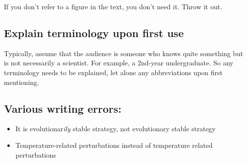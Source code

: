 \documentclass[
]{book}
\providecommand{\tightlist}{%
  \setlength{\itemsep}{0pt}\setlength{\parskip}{0pt}}
\begin{document}
If you don't refer to a figure in the text, you don't need it. Throw it out.

\hypertarget{explain-terminology-upon-first-use}{%
\subsection{Explain terminology upon first use}\label{explain-terminology-upon-first-use}}

Typically, assume that the audience is someone who knows quite something
but is not necessarily a scientist. For example, a 2nd-year undergraduate. So
any terminology needs to be explained, let alone any abbreviations upon first
mentioning.

\hypertarget{various-writing-errors}{%
\subsection{Various writing errors:}\label{various-writing-errors}}

\begin{itemize}
\tightlist
\item
  It is evolutionar\emph{ily} stable strategy, not evolutionary stable strategy
\item
  Temperature-related perturbations instead of temperature related perturbations
\end{itemize}

  
\end{document}
